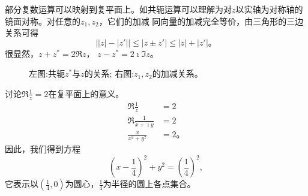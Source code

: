 部分复数运算可以映射到复平面上。如共轭运算可以理解为对$z$以实轴为对称轴的镜面对称。对任意的$z_1,z_2$，它们的加减
同向量的加减完全等价，由三角形的三边关系可得
\begin{equation}
    \left| |z|- |z'| \right| \leq |z \pm z'| \leq |z| + |z'| \textrm{。}
\end{equation}
很显然，$z+z^{*} = 2 \Re z$， $z-z^{*} = 2\imath \Im z$。
\begin{figure}
    \centering
    
\quad 
        
        \caption{左图:共轭$z^{*}$与$z$的关系; 右图:$z_1, z_2$的加减关系。}
    \end{figure}
\begin{examplebox}{讨论$\Re \frac{1}{z} = 2$在复平面上的意义。}
    \begin{align*}
        \Re \frac{1}{z} &= 2\\
        \Re \frac{1}{x+\imath y} &  = 2 \\
        \frac{x}{x^2 +y^2} & = 2 \textrm{。}
    \end{align*}
因此，我们得到方程
\begin{equation*}
    (x-\frac{1}{4})^2 + y^2 = \left( \frac{1}{4}\right)^2,
\end{equation*}
它表示以$(\frac{1}{4},0)$为圆心，$\frac{1}{4}$为半径的圆上各点集合。
\end{examplebox}
        



